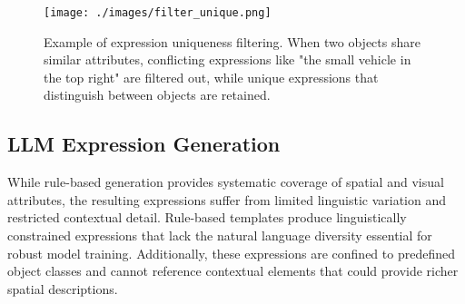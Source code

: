 \begin{figure}[H]
\centering
\begin{minipage}{0.5\textwidth}
\centering
\texttt{[image: ./images/filter\_unique.png]}
\end{minipage}%
\begin{minipage}{0.5\textwidth}
\centering
\hspace{-1cm}
\end{minipage}
\caption{Example of expression uniqueness filtering. When two objects share similar attributes, conflicting expressions like "the small vehicle in the top right" are filtered out, while unique expressions that distinguish between objects are retained.}
\label{fig:filter_unique_example}
\end{figure}

\subsection{LLM Expression Generation}

While rule-based generation provides systematic coverage of spatial and visual attributes, the resulting expressions suffer from limited linguistic variation and restricted contextual detail. Rule-based templates produce linguistically constrained expressions that lack the natural language diversity essential for robust model training. Additionally, these expressions are confined to predefined object classes and cannot reference contextual elements that could provide richer spatial descriptions.

